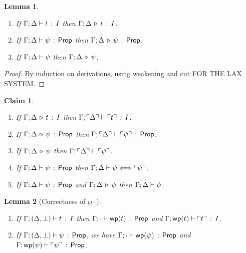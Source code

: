 \documentclass[11pt]{article}
\newtheorem{lemma}{Lemma}
\newtheorem{claim}{Claim}
\begin{document}
\begin{lemma}
\mbox{}
\begin{enumerate}
  \item If $\Gamma;\Delta \vdash t\, :\, I$ then 
    $\Gamma;\Delta \,\triangleright\, t\, :\, I$.
  \item If $\Gamma;\Delta \vdash \psi\, :\, \mathsf{Prop}$ then
    $\Gamma;\Delta \,\triangleright\, \psi\,:\, \mathsf{Prop}$.
  \item If $\Gamma;\Delta \vdash \psi$ then
    $\Gamma;\Delta \,\triangleright\, \psi$.
\end{enumerate}
\end{lemma}

\begin{proof}
By induction on derivations, using weakening and cut FOR THE LAX SYSTEM.
\end{proof}

\begin{claim}
\mbox{}
\begin{enumerate}
  \item If $\Gamma;\Delta \,\triangleright\, t\, :\, I$ then
    $\Gamma;\ulcorner \Delta \urcorner \vdash \ulcorner t \urcorner\, :\, I$.
  \item If $\Gamma;\Delta \,\triangleright\, \psi\,:\, \mathsf{Prop}$ then
    $\Gamma;\ulcorner \Delta \urcorner \vdash \ulcorner \psi \urcorner\, :\, \mathsf{Prop}$.
  \item If $\Gamma;\Delta \,\triangleright\, \psi$ then
    $\Gamma;\ulcorner \Delta \urcorner \vdash \ulcorner \psi \urcorner$.
  \item If $\Gamma;\Delta \vdash \psi\, :\, \mathsf{Prop}$ then
    $\Gamma;\Delta \vdash \psi \Longleftrightarrow \ulcorner \psi \urcorner$.
  \item If $\Gamma;\Delta \vdash \psi\, :\, \mathsf{Prop}$ and $\Gamma;\Delta \,\triangleright\, \psi$ then
    $\Gamma;\Delta \vdash \psi$.
\end{enumerate}
\end{claim}

\begin{lemma}[Correctness of $\wp{\cdot}$]
\mbox{}
  \begin{enumerate}
  \item If $\Gamma;(\Delta,\bot) \vdash t\, :\, I$ then
    $\Gamma;\cdot \vdash \mathop{\mathsf{wp}}(t)\, :\, \mathsf{Prop}$ and
    $\Gamma;\mathop{\mathsf{wp}}(t) \vdash \ulcorner t \urcorner\, :\, I$.
  \item If $\Gamma;(\Delta,\bot) \vdash \psi\, :\, \mathsf{Prop}$, we have
    $\Gamma;\cdot \vdash \mathop{\mathsf{wp}}(\psi)\, :\, \mathsf{Prop}$ and $\Gamma;\mathop{\mathsf{wp}}(\psi) \vdash \ulcorner \psi \urcorner\, :\, \mathsf{Prop}$.
  \end{enumerate}
\end{lemma}
\end{document}
